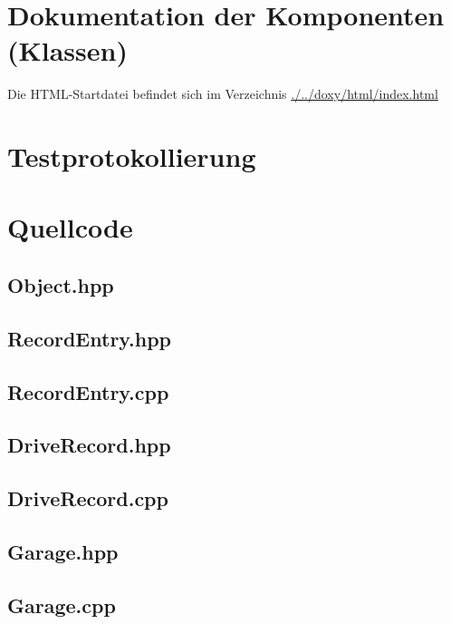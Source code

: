 \documentclass[12pt,naustrian,a4widepaper]{scrartcl}
\begin{document}
\section{Dokumentation der Komponenten (Klassen)}
Die HTML-Startdatei befindet sich im Verzeichnis \href{run:./../doxy/html/index.html}{./../doxy/html/index.html}

\clearpage
\section{Testprotokollierung}


\clearpage
\section{Quellcode}

\subsection{Object.hpp}


\subsection{RecordEntry.hpp}


\subsection{RecordEntry.cpp}


\subsection{DriveRecord.hpp}


\subsection{DriveRecord.cpp}


\subsection{Garage.hpp}


\subsection{Garage.cpp}

\end{document}
